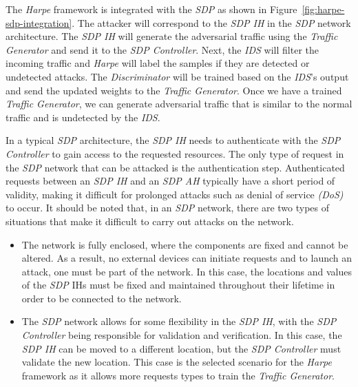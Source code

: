 The \textit{Harpe} framework is integrated with the \textit{SDP} as shown in Figure~\ref{fig:harpe-sdp-integration}.
The attacker will correspond to the \textit{SDP IH} in the \textit{SDP} network architecture.
The \textit{SDP IH} will generate the adversarial traffic using the \textit{Traffic Generator} and send it to the
\textit{SDP Controller}.
Next, the \textit{IDS} will filter the incoming traffic and \textit{Harpe} will label the samples if they are
detected or undetected attacks.
The \textit{Discriminator} will be trained based on the \textit{IDS}’s output and send the updated weights to the
\textit{Traffic Generator}.
Once we have a trained \textit{Traffic Generator}, we can generate adversarial traffic that is similar to the
normal traffic and is undetected by the \textit{IDS}.

In a typical \textit{SDP} architecture, the \textit{SDP IH} needs to authenticate with the \textit{SDP Controller} to
gain access to the requested resources.
The only type of request in the \textit{SDP} network that can be attacked is the authentication step.
Authenticated requests between an \textit{SDP IH} and an \textit{SDP AH} typically have a short period of validity,
making it difficult for prolonged attacks such as denial of service \textit{(DoS)} to occur.
It should be noted that, in an \textit{SDP} network, there are two types of situations that make it difficult to carry
out attacks on the network.

\begin{itemize}
    \item The network is fully enclosed, where the components are fixed and cannot be altered.
    As a result, no external devices can initiate requests and to launch an attack, one must be part of the network.
    In this case, the locations and values of the \textit{SDP} IHs must be fixed and maintained throughout their
    lifetime in order to be connected to the network.

    \item The \textit{SDP} network allows for some flexibility in the \textit{SDP IH}, with the \textit{SDP Controller}
    being responsible for validation and verification.
    In this case, the \textit{SDP IH} can be moved to a different location, but the \textit{SDP Controller} must
    validate the new location.
    This case is the selected scenario for the \textit{Harpe} framework as it allows more requests types to train the
    \textit{Traffic Generator}.
\end{itemize}
